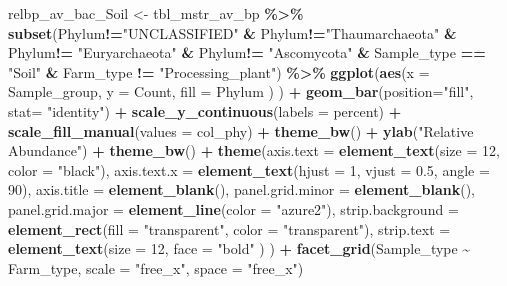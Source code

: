 \documentclass[
]{article}
\newenvironment{Shaded}{\begin{snugshade}}{\end{snugshade}}
\newcommand{\AttributeTok}[1]{\textcolor[rgb]{0.13,0.29,0.53}{#1}}
\newcommand{\DecValTok}[1]{\textcolor[rgb]{0.00,0.00,0.81}{#1}}
\newcommand{\FloatTok}[1]{\textcolor[rgb]{0.00,0.00,0.81}{#1}}
\newcommand{\FunctionTok}[1]{\textcolor[rgb]{0.13,0.29,0.53}{\textbf{#1}}}
\newcommand{\NormalTok}[1]{#1}
\newcommand{\OtherTok}[1]{\textcolor[rgb]{0.56,0.35,0.01}{#1}}
\newcommand{\SpecialCharTok}[1]{\textcolor[rgb]{0.81,0.36,0.00}{\textbf{#1}}}
\newcommand{\StringTok}[1]{\textcolor[rgb]{0.31,0.60,0.02}{#1}}
\begin{document}
\begin{Shaded}
\begin{Highlighting}[]
\NormalTok{relbp\_av\_bac\_Soil }\OtherTok{\textless{}{-}} 
\NormalTok{tbl\_mstr\_av\_bp }\SpecialCharTok{\%\textgreater{}\%}
  \FunctionTok{subset}\NormalTok{(Phylum}\SpecialCharTok{!=}\StringTok{"UNCLASSIFIED"} \SpecialCharTok{\&}\NormalTok{ Phylum}\SpecialCharTok{!=}\StringTok{"Thaumarchaeota"} \SpecialCharTok{\&}\NormalTok{ Phylum}\SpecialCharTok{!=} \StringTok{"Euryarchaeota"} \SpecialCharTok{\&}\NormalTok{ Phylum}\SpecialCharTok{!=} \StringTok{"Ascomycota"} \SpecialCharTok{\&}\NormalTok{ Sample\_type }\SpecialCharTok{==} \StringTok{"Soil"}  \SpecialCharTok{\&}\NormalTok{ Farm\_type }\SpecialCharTok{!=} \StringTok{"Processing\_plant"}\NormalTok{) }\SpecialCharTok{\%\textgreater{}\%}
  \FunctionTok{ggplot}\NormalTok{(}\FunctionTok{aes}\NormalTok{(}\AttributeTok{x =}\NormalTok{ Sample\_group, }
             \AttributeTok{y =}\NormalTok{ Count, }
             \AttributeTok{fill =}\NormalTok{ Phylum}
\NormalTok{             )}
\NormalTok{         ) }\SpecialCharTok{+} 
  \FunctionTok{geom\_bar}\NormalTok{(}\AttributeTok{position=}\StringTok{"fill"}\NormalTok{, }\AttributeTok{stat=} \StringTok{"identity"}\NormalTok{) }\SpecialCharTok{+}
  \FunctionTok{scale\_y\_continuous}\NormalTok{(}\AttributeTok{labels =}\NormalTok{ percent) }\SpecialCharTok{+}
  \FunctionTok{scale\_fill\_manual}\NormalTok{(}\AttributeTok{values =}\NormalTok{ col\_phy) }\SpecialCharTok{+}
  \FunctionTok{theme\_bw}\NormalTok{() }\SpecialCharTok{+} 
  \FunctionTok{ylab}\NormalTok{(}\StringTok{"Relative Abundance"}\NormalTok{) }\SpecialCharTok{+}
  \FunctionTok{theme\_bw}\NormalTok{() }\SpecialCharTok{+}
  \FunctionTok{theme}\NormalTok{(}\AttributeTok{axis.text =} \FunctionTok{element\_text}\NormalTok{(}\AttributeTok{size =} \DecValTok{12}\NormalTok{, }
                                 \AttributeTok{color =} \StringTok{"black"}\NormalTok{),}
        \AttributeTok{axis.text.x =} \FunctionTok{element\_text}\NormalTok{(}\AttributeTok{hjust =} \DecValTok{1}\NormalTok{,}
                                 \AttributeTok{vjust =} \FloatTok{0.5}\NormalTok{,}
                                 \AttributeTok{angle =} \DecValTok{90}\NormalTok{), }
        \AttributeTok{axis.title =} \FunctionTok{element\_blank}\NormalTok{(),}
        \AttributeTok{panel.grid.minor =} \FunctionTok{element\_blank}\NormalTok{(),}
        \AttributeTok{panel.grid.major =} \FunctionTok{element\_line}\NormalTok{(}\AttributeTok{color =} \StringTok{"azure2"}\NormalTok{),}
        \AttributeTok{strip.background =} \FunctionTok{element\_rect}\NormalTok{(}\AttributeTok{fill =} \StringTok{"transparent"}\NormalTok{,}
                                        \AttributeTok{color =} \StringTok{"transparent"}\NormalTok{),}
        \AttributeTok{strip.text =} \FunctionTok{element\_text}\NormalTok{(}\AttributeTok{size =} \DecValTok{12}\NormalTok{,}
                                  \AttributeTok{face =} \StringTok{"bold"}
\NormalTok{                                  )}
\NormalTok{        ) }\SpecialCharTok{+}
  \FunctionTok{facet\_grid}\NormalTok{(Sample\_type }\SpecialCharTok{\textasciitilde{}}\NormalTok{ Farm\_type, }\AttributeTok{scale =} \StringTok{"free\_x"}\NormalTok{, }\AttributeTok{space =} \StringTok{"free\_x"}\NormalTok{)}
\end{Highlighting}
\end{Shaded}
\end{document}
